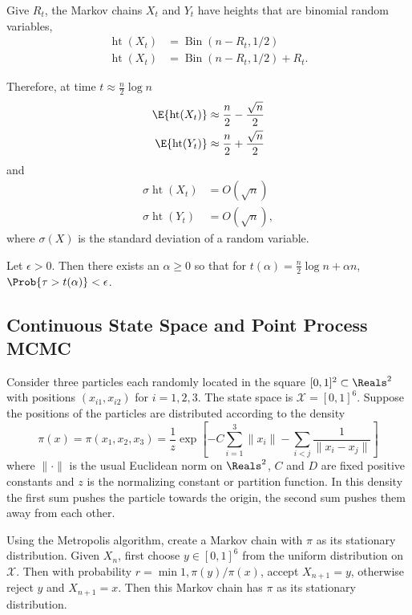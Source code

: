 \documentclass[12pt]{article}
\begin{document}
Give $R_t$, the Markov chains $X_t$ and $Y_t$ have heights that are
binomial random variables,
\begin{align*}
\operatorname{ht}(X_t) &= \operatorname{Bin}(n - R_t, 1/2) \\
\operatorname{ht}(X_t) &= \operatorname{Bin}(n - R_t, 1/2) + R_t.
\end{align*}

Therefore, at time $t \approx \frac{n}{2} \log n$
\begin{align*}
  \E{\operatorname{ht}(X_t)} &\approx \frac{n}{2} - \frac{\sqrt{n}}{2} \\
  \E{\operatorname{ht}(Y_t)} &\approx \frac{n}{2} + \frac{\sqrt{n}}{2}
\end{align*}
and
\begin{align*}
  \sigma{\operatorname{ht}(X_t)} &= O(\sqrt{n}) \\
  \sigma{\operatorname{ht}(Y_t)} &= O(\sqrt{n}),
\end{align*}
where $\sigma(X)$ is the standard deviation of a random variable.

\begin{theorem}
  Let $\epsilon > 0$.  Then there exists an $\alpha \ge 0$ so that for
  $t(\alpha) = \frac{n}{2} \log n + \alpha n$, $\Prob{\tau >
    t(\alpha)} < \epsilon$.
\end{theorem}

\subsection*{Continuous State Space and Point Process MCMC}

Consider three particles each randomly located in the square \( [0,1]^2
\subset \Reals^2 \) with positions \( (x_{i1}, x_{i2}) \) for \( i =
1,2,3 \). The state space is \( \mathcal{X} = [0,1]^6 \).  Suppose the
positions of the particles are distributed according to the density
\[
    \pi(x) = \pi(x_1,x_2,x_3) = \frac{1}{z} \exp\left[ -C \sum\limits_{i=1}^3
    \|x_i\| - \sum\limits_{i<j} \frac{1}{\| x_i - x_j \|} \right]
\] where \( \| \cdot \| \) is the usual Euclidean norm on \( \Reals^2 \),
\( C \) and \( D \) are fixed positive constants and \( z \) is the
normalizing constant or partition function.  In this density the first
sum pushes the particle towards the origin, the second sum pushes them
away from each other.

Using the Metropolis algorithm, create a Markov chain with \( \pi \) as
its stationary distribution.  Given \( X_n \), first choose \( y \in [0,1]^6
\) from the uniform distribution on \( \mathcal{X} \).  Then with
probability \( r = \min{1, \pi(y)/\pi(x)} \), accept \( X_{n+1} = y \),
otherwise reject \( y \) and \( X_{n+1} = x \).  Then this Markov chain
has \( \pi \) as its stationary distribution.
\end{document}

